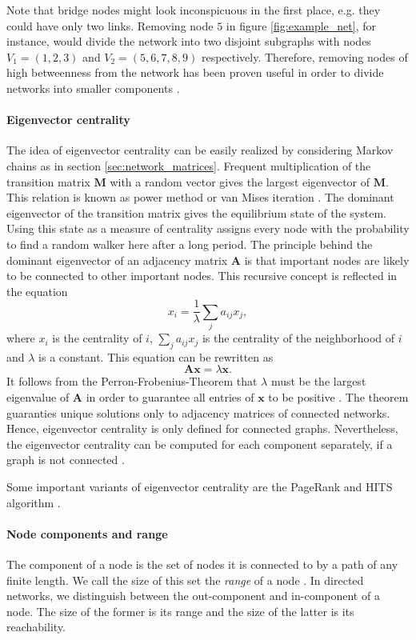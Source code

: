 \documentclass[openright,twoside,headsepline]{scrbook}
\begin{document}
Note that bridge nodes might look inconspicuous in the first place, e.g. they could have only two links.
Removing node $5$ in figure \ref{fig:example_net}, for instance, would divide the network into two disjoint subgraphs with nodes $V_1=(1,2,3)$ and $V_2=(5,6,7,8,9)$ respectively.
Therefore, removing nodes of high betweenness from the network has been proven useful in order to divide networks into smaller components \citep{girvan2002,Newman:2004}.


\paragraph{Eigenvector centrality\color{Cayenne}{.}}
The idea of eigenvector centrality can be easily realized by considering Markov chains as in section \ref{sec:network_matrices}.
Frequent multiplication of the transition matrix $\mathbf{M}$ with a random vector gives the largest eigenvector of $\mathbf{M}$.
This relation is known as power method or van Mises iteration \citep{van_mises}.
The dominant eigenvector of the transition matrix gives the equilibrium state of the system.
Using this state as a measure of centrality assigns every node with the probability to find a random walker here after a long period.
The principle behind the dominant eigenvector of an adjacency matrix $\mathbf{A}$ is that important nodes are likely to be connected to other important nodes.
This recursive concept is reflected in the equation
\[
x_i =\frac{1}{\lambda } \sum _j a_{ij} x_j ,
\]
where $x_i$ is the centrality of $i$, $\sum _j a_{ij} x_j$ is the centrality of the neighborhood of $i$ and $\lambda $ is a constant.
This equation can be rewritten as
\begin{equation}
\mathbf{Ax}=\lambda \mathbf{x}.
\end{equation}
It follows from the Perron-Frobenius-Theorem that $\lambda $ must be the largest eigenvalue of $\mathbf{A}$ in order to guarantee all entries of $\mathbf{x}$ to be positive \citep{Bonacich:1972,Bonacich:2007}.
The theorem guaranties unique solutions only to adjacency matrices of connected networks.
Hence, eigenvector centrality is only defined for connected graphs.
Nevertheless, the eigenvector centrality can be computed for each component separately, if a graph is not connected \citep{Bonacich:2007}.

Some important variants of eigenvector centrality are the PageRank and HITS algorithm \citep{Kleinberg:1999,PageRank:}.

\paragraph{Node components and range\color{Cayenne}{.}}
The component of a node is the set of nodes it is connected to by a path of any finite length.
We call the size of this set the \emph{range} of a node \citep{Lentz:2012pre}.
In directed networks, we distinguish between the out-component and in-component of a node.
The size of the former is its range and the size of the latter is its reachability.
\end{document}
